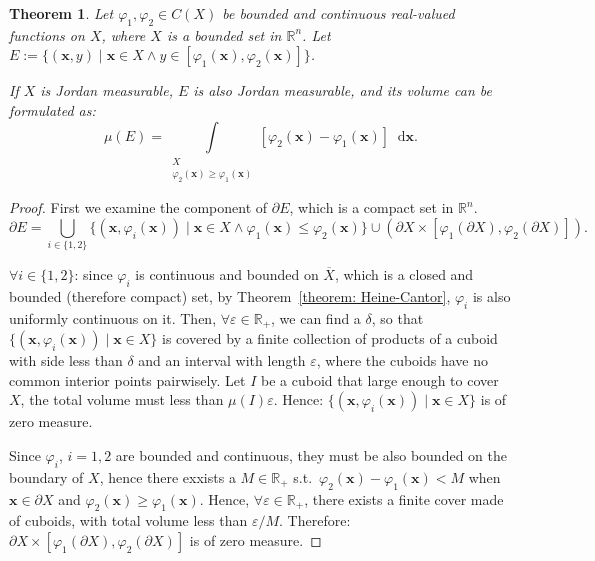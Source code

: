 \documentclass[openany]{book}
\theoremstyle{plain}
\newtheorem{theorem}{Theorem}[section] %
\theoremstyle{definition}
\newcommand{\dif}{\mathop{}\!\mathrm{d}} %
\newcommand*{\bv}{\boldsymbol} %
\begin{document}
\begin{theorem}
	Let $\varphi_1, \varphi_2 \in C(X)$ be bounded and continuous real-valued functions on $X$, where $X$ is a bounded set in $\mathbb R^n$. 
	Let $E := \{ (\bv x, y) \mid \bv x \in X \wedge y \in [\varphi_1(\bv x), \varphi_2(\bv x)] \}$.

	If $X$ is Jordan measurable, $E$ is also Jordan measurable, and its volume can be formulated as:
	\begin{equation*}
		\mu(E) = \int\limits_{\substack{X \\ \varphi_2(\bv x) \geq \varphi_1(\bv x)}} [\varphi_2(\bv x) - \varphi_1(\bv x)] \dif \bv x .
	\end{equation*}
\end{theorem}
\begin{proof}
	First we examine the component of $\partial E$, which is a compact set in $\mathbb R^n$.  
	\begin{equation*}
		\partial E = \bigcup_{i \in \{1, 2\}}\{(\bv x, \varphi_i(\bv x)) \mid \bv x \in X \wedge \varphi_1(\bv x) \leq \varphi_2(\bv x)\}
		\cup (\partial X \times [\varphi_1(\partial X), \varphi_2(\partial X)]).
	\end{equation*}

	$\forall i \in \{1, 2\}$: since $\varphi_i$ is continuous and bounded on $\overline X$, which is a closed and bounded (therefore compact) set, by Theorem~\ref{theorem: Heine-Cantor}, $\varphi_i$ is also uniformly continuous on it. 
	Then, $\forall \varepsilon \in \mathbb R_+$, we can find a $\delta$, so that $\{(\bv x, \varphi_i(\bv x)) \mid \bv x \in X\}$ is covered by a finite collection of products of a cuboid with side less than $\delta$ and an interval with length $\varepsilon$, where the cuboids have no common interior points pairwisely. 
	Let $I$ be a cuboid that large enough to cover $X$, the total volume must less than $\mu(I) \varepsilon$.
	Hence: $\{(\bv x, \varphi_i(\bv x)) \mid \bv x \in X\}$ is of zero measure.
	
	Since $\varphi_i$, $i = 1, 2$ are bounded and continuous, they must be also bounded on the boundary of $X$, hence there exxists a $M \in \mathbb R_+$ s.t.\ $\varphi_2(\bv x) - \varphi_1(\bv x) < M$ when $\bv x \in \partial X$ and $\varphi_2(\bv x) \geq \varphi_1(\bv x)$. 
	Hence, $\forall \varepsilon \in \mathbb R_+$, there exists a finite cover made of cuboids, with total volume less than $\varepsilon / M$. 
	Therefore: $\partial X \times [\varphi_1(\partial X), \varphi_2(\partial X)]$ is of zero measure.
\end{proof}
\end{document}
